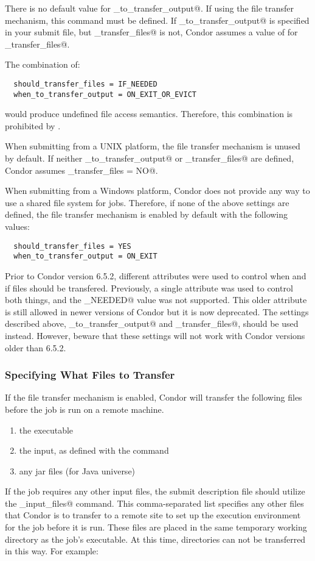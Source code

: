 There is no default value for \verb@when_to_transfer_output@.
If using the file transfer mechanism, 
this command must be defined.
If \verb@when_to_transfer_output@ is specified in your submit
file, but \verb@should_transfer_files@ is not, Condor assumes a
value of \verb@YES@ for \verb@should_transfer_files@.

\Note The combination of:
\begin{verbatim}
  should_transfer_files = IF_NEEDED
  when_to_transfer_output = ON_EXIT_OR_EVICT
\end{verbatim}
would produce undefined file access semantics.
Therefore, this combination is prohibited by .

When submitting from a UNIX platform,
the file transfer mechanism is unused by default.
If neither
\verb@when_to_transfer_output@ or \verb@should_transfer_files@ 
are defined, Condor assumes
\verb@should_transfer_files = NO@.

When submitting from a Windows platform,
Condor does not provide any way to use a shared file
system for jobs. 
Therefore, if none of the above settings are defined, the file
transfer mechanism is enabled by default with the following values:

\begin{verbatim}
  should_transfer_files = YES
  when_to_transfer_output = ON_EXIT
\end{verbatim}

\Note Prior to Condor version 6.5.2, different attributes were used to
control when and if files should be transfered.
Previously, a single attribute was used to control both things, and
the \verb@IF_NEEDED@ value was not supported.
This older attribute is still allowed in newer versions of Condor but
it is now deprecated.
The settings described above, \verb@when_to_transfer_output@ and
\verb@should_transfer_files@, should be used instead.
However, beware that these settings will not work with Condor versions
older than 6.5.2. 


\subsubsection{Specifying What Files to Transfer}

If the file transfer mechanism is enabled,
Condor will transfer the following files before the job
is run on a remote machine.
\begin{enumerate}
  \item the executable
  \item the input, as defined with the \verb@input@ command
  \item any jar files (for Java universe)
\end{enumerate}
If the job requires any other input files,
the submit description file should utilize the
\verb@transfer_input_files@ command.
This comma-separated list specifies any other files that Condor is to
transfer to a remote site to set up the execution environment for the
job before it is run.
These files are placed in the same temporary working directory
as the job's executable.
At this time, directories can not be transferred in this way.
For example:

